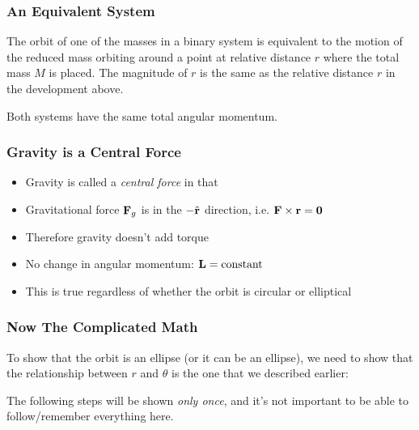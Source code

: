 \documentclass[12pt,compress,aspectratio=169]{beamer}
\newcommand{\mb}[1]{\ensuremath\mathbf{#1}}
\begin{document}
\begin{frame}
  \frametitle{An Equivalent System}

  The orbit of one of the masses in a binary system is equivalent to the motion
  of the reduced mass orbiting around a point at relative distance $r$ where
  the total mass $M$ is placed. The magnitude of $r$ is the same as the
  relative distance $r$ in the development above.
  \begin{center}
  \end{center}

  Both systems have the same total angular momentum.
\end{frame}



\begin{frame}
  \frametitle{Gravity is a Central Force}
  \begin{itemize}
  \item Gravity is called a \emph{central force} in that
  \item Gravitational force $\mb{F}_g$ is in the $-\hat{\mb{r}}$ direction, i.e.
    $\mb{F}\times\mb{r}=\mb{0}$
  \item Therefore gravity doesn't add torque
  \item No change in angular momentum: $\mb{L}=\textrm{constant}$
  \item This is true regardless of whether the orbit is circular or elliptical
  \end{itemize}
\end{frame}



\begin{frame}
  \frametitle{Now The Complicated Math}
  To show that the orbit is an ellipse (or it can be an ellipse), we need to
  show that the relationship between $r$ and $\theta$ is the one
  that we described earlier:

  
  The following steps will be shown \emph{only once}, and it's not important to
  be able to follow/remember everything here.
\end{frame}
\end{document}
